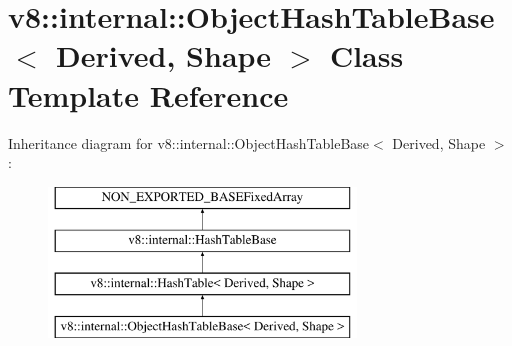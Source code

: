 \hypertarget{classv8_1_1internal_1_1ObjectHashTableBase}{}\section{v8\+:\+:internal\+:\+:Object\+Hash\+Table\+Base$<$ Derived, Shape $>$ Class Template Reference}
\label{classv8_1_1internal_1_1ObjectHashTableBase}
Inheritance diagram for v8\+:\+:internal\+:\+:Object\+Hash\+Table\+Base$<$ Derived, Shape $>$\+:\begin{figure}[H]
\begin{center}
\leavevmode
\includegraphics[height=4.000000cm]{classv8_1_1internal_1_1ObjectHashTableBase}
\end{center}
\end{figure}
